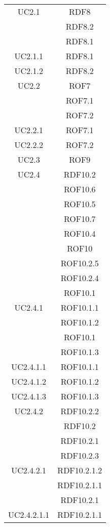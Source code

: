\begin{longtable}{|c|c|}
\midrule
UC2.1
& RDF8\\
& RDF8.2\\
& RDF8.1\\

\midrule
UC2.1.1
& RDF8.1\\

\midrule
UC2.1.2
& RDF8.2\\

\midrule
UC2.2
& ROF7\\
& ROF7.1\\
& ROF7.2\\

\midrule
UC2.2.1
& ROF7.1\\

\midrule
UC2.2.2
& ROF7.2\\

\midrule
UC2.3
& ROF9\\

\midrule
UC2.4
& RDF10.2\\
& ROF10.6\\
& ROF10.5\\
& ROF10.7\\
& ROF10.4\\
& ROF10\\
& ROF10.2.5\\
& ROF10.2.4\\
& ROF10.1\\

\midrule
UC2.4.1
& ROF10.1.1\\
& ROF10.1.2\\
& ROF10.1\\
& ROF10.1.3\\

\midrule
UC2.4.1.1
& ROF10.1.1\\

\midrule
UC2.4.1.2
& ROF10.1.2\\

\midrule
UC2.4.1.3
& ROF10.1.3\\

\midrule
UC2.4.2
& RDF10.2.2\\
& RDF10.2\\
& RDF10.2.1\\
& RDF10.2.3\\

\midrule
UC2.4.2.1
& RDF10.2.1.2\\
& RDF10.2.1.1\\
& RDF10.2.1\\

\midrule
UC2.4.2.1.1
& RDF10.2.1.1\\


\end{longtable}
